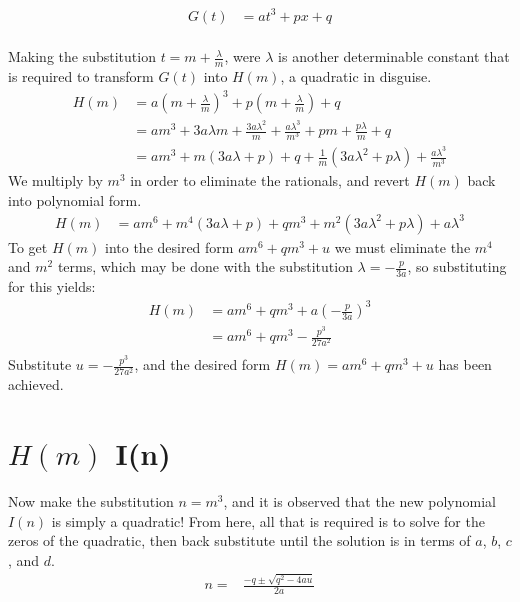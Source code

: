 \documentclass[12pt]{article}
\begin{document}
\begin{equation}
\begin{aligned}
    G(t)&=at^3+px+q
\end{aligned}
\end{equation}\\
Making the substitution $t=m+\frac{\lambda}{m}$, were $\lambda$ is another determinable constant that is required to transform $G(t)$ into $H(m)$, a quadratic in disguise.\\  
\begin{equation}
\begin{aligned}
    H(m)&=a(m+\frac{\lambda}{m})^3+p(m+\frac{\lambda}{m})+q\\
& = am^3+3a\lambda m+\frac{3a\lambda^2}{m}+\frac{a\lambda^3}{m^3}+pm+\frac{p\lambda}{m}+q\\
& = am^3+m(3a\lambda +p)+q+\frac{1}{m}(3a\lambda^2+p\lambda)+\frac{a\lambda^3}{m^3}
\end{aligned}
\end{equation}
We multiply by $m^3$ in order to eliminate the rationals, and revert $H(m)$ back into polynomial form.
\begin{equation}
\begin{aligned}
    H(m)&=am^6+m^4(3a\lambda +p)+qm^3+m^2(3a\lambda^2+p\lambda)+a\lambda^3
\end{aligned}
\end{equation}
To get $H(m)$ into the desired form $am^6+qm^3+u$ we must eliminate the $m^4$ and $m^2$ terms, which may be done with the substitution $\lambda=-\frac{p}{3a}$, so substituting for this yields:\\
\begin{equation}
\begin{aligned}
    H(m)&=am^6+qm^3+a(-\frac{p}{3a})^3\\
& = am^6+qm^3-\frac{p^3}{27a^2}\\
\end{aligned}
\end{equation}
Substitute $u=-\frac{p^3}{27a^2}$, and the desired form $H(m)=am^6+qm^3+u$ has been achieved.

\section{$H(m)$ \longrightarrow I(n)}

Now make the substitution $n=m^3$, and it is observed that the new polynomial $I(n)$ is simply a quadratic! From here, all that is required is to solve for the zeros of the quadratic, then back substitute until the solution is in terms of $a$, $b$, $c$, and $d$.
\begin{equation}
\begin{aligned}
n=&\frac{-q\pm \sqrt{q^2-4au}}{2a}\\
\end{aligned}
\end{equation}
\end{document}
